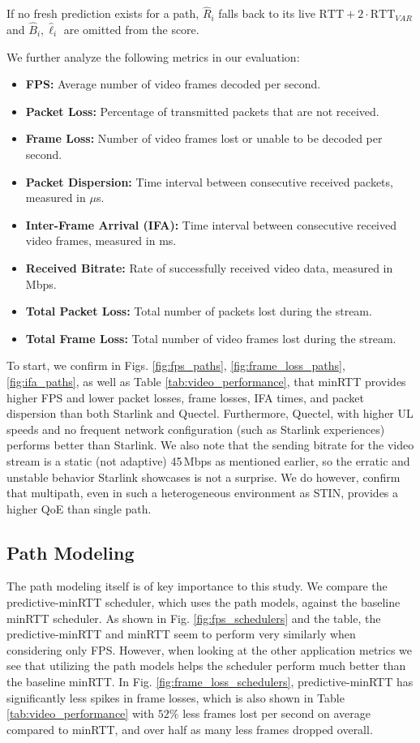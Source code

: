 \documentclass[sigconf,nonacm]{acmart}
\begin{document}
If no fresh prediction exists for a path, $\hat{R}_i$ falls back to its live
$\text{RTT} + 2\cdot\text{RTT}_{VAR}$ and $\hat{B}_i, \hat{\ell}_i$ are omitted from the
score.

We further analyze the following metrics in our evaluation:
\begin{itemize}
    \item \textbf{FPS:} Average number of video frames decoded per second.
    \item \textbf{Packet Loss:} Percentage of transmitted packets that are not received.
    \item \textbf{Frame Loss:} Number of video frames lost or unable to be decoded per second.
    \item \textbf{Packet Dispersion:} Time interval between consecutive received packets, measured in $\mu$s.
    \item \textbf{Inter-Frame Arrival (IFA):} Time interval between consecutive received video frames, measured in ms.
    \item \textbf{Received Bitrate:} Rate of successfully received video data, measured in Mbps.
    \item \textbf{Total Packet Loss:} Total number of packets lost during the stream.
    \item \textbf{Total Frame Loss:} Total number of video frames lost during the stream.
\end{itemize}

To start, we confirm in Figs. \eqref{fig:fps_paths}, \eqref{fig:frame_loss_paths}, \eqref{fig:ifa_paths}, as well as Table \eqref{tab:video_performance}, that minRTT provides higher FPS and lower packet losses, frame losses, IFA times, and packet dispersion than both Starlink and Quectel. Furthermore, Quectel, with higher UL speeds and no frequent network configuration (such as Starlink experiences) performs better than Starlink. We also note that the sending bitrate for the video stream is a static (not adaptive) 45\,Mbps as mentioned earlier, so the erratic and unstable behavior Starlink showcases is not a surprise. We do however, confirm that multipath, even in such a heterogeneous environment as STIN, provides a higher QoE than single path.

\subsection{Path Modeling}

The path modeling itself is of key importance to this study. We compare the predictive-minRTT scheduler, which uses the path models, against the baseline minRTT scheduler. As shown in Fig. \eqref{fig:fps_schedulers} and the table, the predictive-minRTT and minRTT seem to perform very similarly when considering only FPS. However, when looking at the other application metrics we see that utilizing the path models helps the scheduler perform much better than the baseline minRTT. In Fig. \eqref{fig:frame_loss_schedulers}, predictive-minRTT has significantly less spikes in frame losses, which is also shown in Table \eqref{tab:video_performance} with $52\%$ less frames lost per second on average compared to minRTT, and over half as many less frames dropped overall. 
\end{document}
